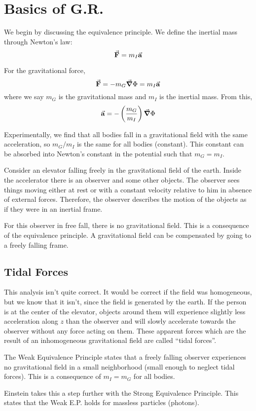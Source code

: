 \documentclass[a4paper,twoside,master.tex]{subfiles}
\begin{document}
\section{Basics of G.R.}\label{sec:basics_of_g.r.}

We begin by discussing the equivalence principle. We define the inertial mass through Newton's law:
\begin{equation}
    \va{F} = m_I \va{a}
\end{equation}

For the gravitational force,
\begin{equation}
    \va{F} = - m_G \grad{\Phi} = m_I \va{a}
\end{equation}
where we say $ m_G $ is the gravitational mass and $ m_I $ is the inertial mass. From this,
\begin{equation}
    \va{a} = - \left( \frac{m_G}{m_I} \right) \grad{\Phi}
\end{equation}

Experimentally, we find that all bodies fall in a gravitational field with the same acceleration, so $ m_G / m_I $ is the same for all bodies (constant). This constant can be absorbed into Newton's constant in the potential such that $ m_G = m_I $.


Consider an elevator falling freely in the gravitational field of the earth. Inside the accelerator there is an observer and some other objects. The observer sees things moving either at rest or with a constant velocity relative to him in absence of external forces. Therefore, the observer describes the motion of the objects as if they were in an inertial frame.

For this observer in free fall, there is no gravitational field. This is a consequence of the equivalence principle. A gravitational field can be compensated by going to a freely falling frame.

\subsection{Tidal Forces}\label{sub:tidal_forces}

This analysis isn't quite correct. It would be correct if the field was homogeneous, but we know that it isn't, since the field is generated by the earth. If the person is at the center of the elevator, objects around them will experience slightly less acceleration along $ z $ than the observer and will slowly accelerate towards the observer without any force acting on them. These apparent forces which are the result of an inhomogeneous gravitational field are called ``tidal forces''.


The Weak Equivalence Principle states that a freely falling observer experiences no gravitational field in a small neighborhood (small enough to neglect tidal forces). This is a consequence of $ m_I = m_G $ for all bodies.

Einstein takes this a step further with the Strong Equivalence Principle. This states that the Weak E.P. holds for massless particles (photons).
\end{document}
